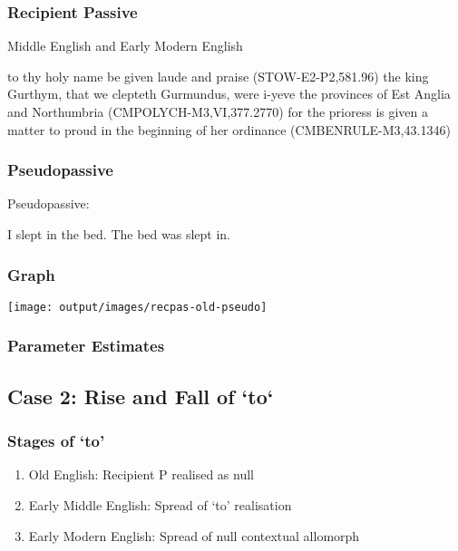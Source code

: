 \documentclass{beamer}
\begin{document}
\begin{frame}
	\frametitle{Recipient Passive}
	\begin{exe}
		\ex Middle English \citep{Kroch.2000} and Early Modern English \citep{Kroch.2004}
		\begin{xlist}
			\ex\label{ex:obliq-to-rec-eng} to thy holy name be given laude and praise (STOW-E2-P2,581.96)
			\ex\label{ex:obliq-rec-eng} the king Gurthym, that we clepteth Gurmundus, were i-yeve the provinces of Est Anglia and Northumbria (CMPOLYCH-M3,VI,377.2770)
			\ex\label{ex:nom-rec-eng} for the prioress is given a matter to proud in the beginning of her ordinance (CMBENRULE-M3,43.1346)
		\end{xlist}
	\end{exe}
\end{frame}

\begin{frame}
	\frametitle{Pseudopassive}
	\begin{exe}
		\ex Pseudopassive:
		\begin{xlist}
			\ex I slept in the bed.
			\ex The bed was slept in.
		\end{xlist}
	\end{exe}
\end{frame}

\begin{frame}
	\frametitle{Graph}
	\texttt{[image: output/images/recpas-old-pseudo]}
\end{frame}

\begin{frame}
	\frametitle{Parameter Estimates}
	
\end{frame}

\subsection{Case 2: Rise and Fall of `to`}
\begin{frame}
	\frametitle{Stages of `to'}
	\begin{enumerate}
		\item Old English: Recipient P realised as null 
		\item Early Middle English: Spread of `to' realisation
		\item Early Modern English: Spread of null contextual allomorph
	\end{enumerate}
\end{frame}
\end{document}
